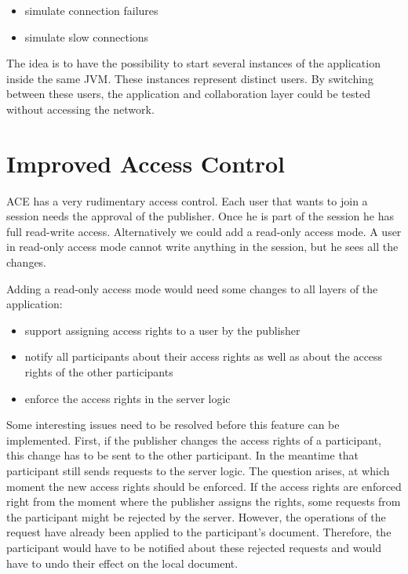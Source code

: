 \begin{itemize}
 \item simulate connection failures
 \item simulate slow connections
\end{itemize}

The idea is to have the possibility to start several instances of the
application inside the same JVM. These instances represent distinct users.
By switching between these users, the application and collaboration layer
could be tested without accessing the network.



\section{Improved Access Control}
ACE has a very rudimentary access control. Each user that wants to join a
session needs the approval of the publisher. Once he is part of the session
he has full read-write access. Alternatively we could add a read-only
access mode. A user in read-only access mode cannot write anything in
the session, but he sees all the changes.

Adding a read-only access mode would need some changes to all layers of
the application:

\begin{itemize}
 \item support assigning access rights to a user by the publisher
 \item notify all participants about their access rights as well as about
       the access rights of the other participants
 \item enforce the access rights in the server logic
\end{itemize}

Some interesting issues need to be resolved before this feature can be
implemented. First, if the publisher changes the access rights of a 
participant, this change has to be sent to the other participant. In the
meantime that participant still sends requests to the server logic. The
question arises, at which moment the new access rights should be enforced.
If the access rights are enforced right from the moment where the publisher
assigns the rights, some requests from the participant might be rejected by the 
server. However, the operations of the request have already been applied
to the participant's document. Therefore, the participant would have to
be notified about these rejected requests and would have to undo their
effect on the local document.



